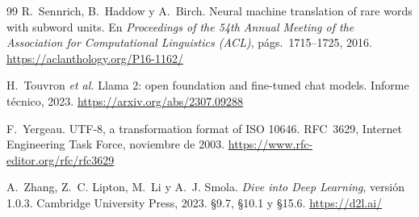 \begin{thebibliography}{99}
R.~Sennrich, B.~Haddow y A.~Birch.
\newblock Neural machine translation of rare words with subword units.
\newblock En \emph{Proceedings of the 54th Annual Meeting of the Association for Computational Linguistics (ACL)}, págs.~1715--1725, 2016.
\newblock \url{https://aclanthology.org/P16-1162/}

H.~Touvron \emph{et al.}
\newblock Llama 2: open foundation and fine-tuned chat models.
\newblock Informe técnico, 2023.
\newblock \url{https://arxiv.org/abs/2307.09288}

F.~Yergeau.
\newblock UTF-8, a transformation format of ISO 10646.
\newblock RFC~3629, Internet Engineering Task Force, noviembre de 2003.
\newblock \url{https://www.rfc-editor.org/rfc/rfc3629}

A.~Zhang, Z.~C. Lipton, M.~Li y A.~J. Smola.
\newblock \emph{Dive into Deep Learning}, versión 1.0.3.
\newblock Cambridge University Press, 2023. §9.7, §10.1 y §15.6.
\newblock \url{https://d2l.ai/}

\end{thebibliography}

